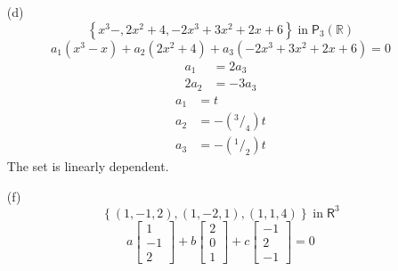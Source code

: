 \begin{enumerate}
\item[(d)]
\[
\left\{x^3 - , 2x^2 + 4, -2x^3 + 3x^2 + 2x +6\right\} \;\text{in}\;  \mathsf{P}_3\left(\mathbb{R}\right)
\]
\begin{equation}
a_1\left(x^3-x\right) +a_2\left(2x^2 + 4\right) + a_3\left(-2x^3
  +3x^2+2x+6\right) = 0
\end{equation}
\begin{align}
a_1 &= 2a_3\\
2a_2 &= -3a_3
\end{align}
\begin{align}
a_1 &= t\\
a_2 &= -\left(^3/_4\right)t\\
a_3 &= -\left(^1/_2\right)t
\end{align}
The set is linearly dependent.
\newpage{}
\item[(f)]
\[
\left\{\left(1,-1,2\right),\left(1,-2,1\right),\left(1,1,4\right)\right\}
\;\text{in}\; \mathsf{R}^3
\]
\begin{equation}
a\begin{bmatrix}
1\\
-1\\
2
\end{bmatrix}
+ b\begin{bmatrix}
2\\
0\\
1
\end{bmatrix}
+ c\begin{bmatrix}
-1\\
2\\
-1
\end{bmatrix}
=0
\end{equation}


\end{enumerate}
